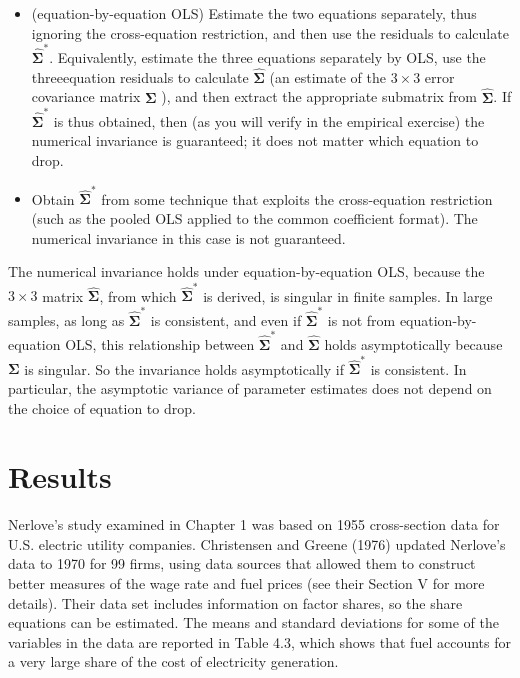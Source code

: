 \documentclass[10pt]{article}
\begin{document}
\begin{itemize}
  \item (equation-by-equation OLS) Estimate the two equations separately, thus ignoring the cross-equation restriction, and then use the residuals to calculate $\widehat{\boldsymbol{\Sigma}}^{*}$. Equivalently, estimate the three equations separately by OLS, use the threeequation residuals to calculate $\widehat{\mathbf{\Sigma}}$ (an estimate of the $3 \times 3$ error covariance matrix $\boldsymbol{\Sigma}$ ), and then extract the appropriate submatrix from $\widehat{\boldsymbol{\Sigma}}$. If $\widehat{\boldsymbol{\Sigma}}^{*}$ is thus obtained, then (as you will verify in the empirical exercise) the numerical invariance is guaranteed; it does not matter which equation to drop.
  \item Obtain $\widehat{\mathbf{\Sigma}}^{*}$ from some technique that exploits the cross-equation restriction (such as the pooled OLS applied to the common coefficient format). The numerical invariance in this case is not guaranteed.
\end{itemize}

The numerical invariance holds under equation-by-equation OLS, because the $3 \times 3$ matrix $\widehat{\boldsymbol{\Sigma}}$, from which $\widehat{\boldsymbol{\Sigma}}^{*}$ is derived, is singular in finite samples. In large samples, as long as $\widehat{\boldsymbol{\Sigma}}^{*}$ is consistent, and even if $\widehat{\boldsymbol{\Sigma}}^{*}$ is not from equation-by-equation OLS, this relationship between $\widehat{\boldsymbol{\Sigma}}^{*}$ and $\widehat{\boldsymbol{\Sigma}}$ holds asymptotically because $\boldsymbol{\Sigma}$ is singular. So the invariance holds asymptotically if $\widehat{\mathbf{\Sigma}}^{*}$ is consistent. In particular, the asymptotic variance of parameter estimates does not depend on the choice of equation to drop.

\section*{Results}
Nerlove's study examined in Chapter 1 was based on 1955 cross-section data for U.S. electric utility companies. Christensen and Greene (1976) updated Nerlove's data to 1970 for 99 firms, using data sources that allowed them to construct better measures of the wage rate and fuel prices (see their Section V for more details). Their data set includes information on factor shares, so the share equations can be estimated. The means and standard deviations for some of the variables in the data are reported in Table 4.3, which shows that fuel accounts for a very large share of the cost of electricity generation.
\end{document}
